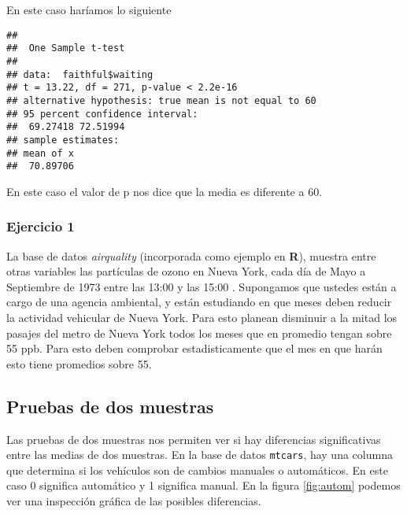 \documentclass[]{book}
\newenvironment{Shaded}{\begin{snugshade}}{\end{snugshade}}
\newcommand{\DataTypeTok}[1]{\textcolor[rgb]{0.13,0.29,0.53}{#1}}
\newcommand{\DecValTok}[1]{\textcolor[rgb]{0.00,0.00,0.81}{#1}}
\newcommand{\KeywordTok}[1]{\textcolor[rgb]{0.13,0.29,0.53}{\textbf{#1}}}
\newcommand{\NormalTok}[1]{#1}
\newcommand{\OperatorTok}[1]{\textcolor[rgb]{0.81,0.36,0.00}{\textbf{#1}}}
\newcommand{\StringTok}[1]{\textcolor[rgb]{0.31,0.60,0.02}{#1}}
\begin{document}
En este caso haríamos lo siguiente

\begin{Shaded}
\end{Shaded}

\begin{verbatim}
## 
##  One Sample t-test
## 
## data:  faithful$waiting
## t = 13.22, df = 271, p-value < 2.2e-16
## alternative hypothesis: true mean is not equal to 60
## 95 percent confidence interval:
##  69.27418 72.51994
## sample estimates:
## mean of x 
##  70.89706
\end{verbatim}

En este caso el valor de p nos dice que la media es diferente a 60.

\hypertarget{ejercicio-1}{%
\subsubsection{Ejercicio 1}\label{ejercicio-1}}

La base de datos \emph{airquality} (incorporada como ejemplo en \textbf{R}), muestra entre otras variables las partículas de ozono en Nueva York, cada día de Mayo a Septiembre de 1973 entre las 13:00 y las 15:00 \citep{chambers35graphical}. Supongamos que ustedes están a cargo de una agencia ambiental, y están estudiando en que meses deben reducir la actividad vehicular de Nueva York. Para esto planean disminuir a la mitad los pasajes del metro de Nueva York todos los meses que en promedio tengan sobre 55 ppb. Para esto deben comprobar estadisticamente que el mes en que harán esto tiene promedios sobre 55.

\hypertarget{pruebas-de-dos-muestras}{%
\subsection{Pruebas de dos muestras}\label{pruebas-de-dos-muestras}}

Las pruebas de dos muestras nos permiten ver si hay diferencias significativas entre las medias de dos muestras. En la base de datos \texttt{mtcars}, hay una columna que determina si los vehículos son de cambios manuales o automáticos. En este caso 0 significa automático y 1 significa manual. En la figura \ref{fig:autom} podemos ver una inspección gráfica de las posibles diferencias.
\end{document}
